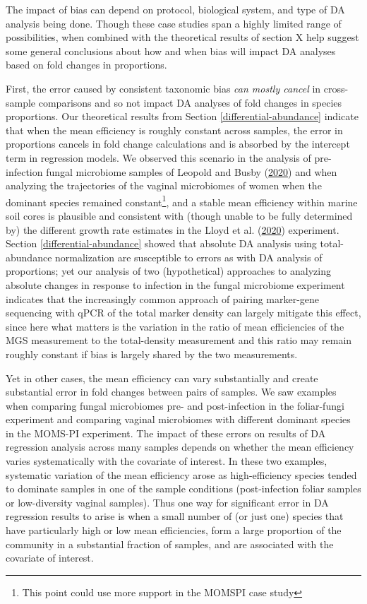 \documentclass[
]{article}
\begin{document}
The impact of bias can depend on protocol, biological system, and type of DA analysis being done.
Though these case studies span a highly limited range of possibilities, when combined with the theoretical results of section X help suggest some general conclusions about how and when bias will impact DA analyses based on fold changes in proportions.

First, the error caused by consistent taxonomic bias \emph{can mostly cancel} in cross-sample comparisons and so not impact DA analyses of fold changes in species proportions.
Our theoretical results from Section \ref{differential-abundance} indicate that when the mean efficiency is roughly constant across samples, the error in proportions cancels in fold change calculations and is absorbed by the intercept term in regression models.
We observed this scenario in the analysis of pre-infection fungal microbiome samples of Leopold and Busby (\protect\hyperlink{ref-leopold2020host}{2020}) and when analyzing the trajectories of the vaginal microbiomes of women when the dominant species remained constant\footnote{This point could use more support in the MOMSPI case study}, and a stable mean efficiency within marine soil cores is plausible and consistent with (though unable to be fully determined by) the different growth rate estimates in the Lloyd et al. (\protect\hyperlink{ref-lloyd2020evid}{2020}) experiment.
Section \ref{differential-abundance} showed that absolute DA analysis using total-abundance normalization are susceptible to errors as with DA analysis of proportions; yet our analysis of two (hypothetical) approaches to analyzing absolute changes in response to infection in the fungal microbiome experiment indicates that the increasingly common approach of pairing marker-gene sequencing with qPCR of the total marker density can largely mitigate this effect, since here what matters is the variation in the ratio of mean efficiencies of the MGS measurement to the total-density measurement and this ratio may remain roughly constant if bias is largely shared by the two measurements.

Yet in other cases, the mean efficiency can vary substantially and create substantial error in fold changes between pairs of samples.
We saw examples when comparing fungal microbiomes pre- and post-infection in the foliar-fungi experiment and comparing vaginal microbiomes with different dominant species in the MOMS-PI experiment.
The impact of these errors on results of DA regression analysis across many samples depends on whether the mean efficiency varies systematically with the covariate of interest.
In these two examples, systematic variation of the mean efficiency arose as high-efficiency species tended to dominate samples in one of the sample conditions (post-infection foliar samples or low-diversity vaginal samples).
Thus one way for significant error in DA regression results to arise is when a small number of (or just one) species that have particularly high or low mean efficiencies, form a large proportion of the community in a substantial fraction of samples, and are associated with the covariate of interest.
\end{document}
